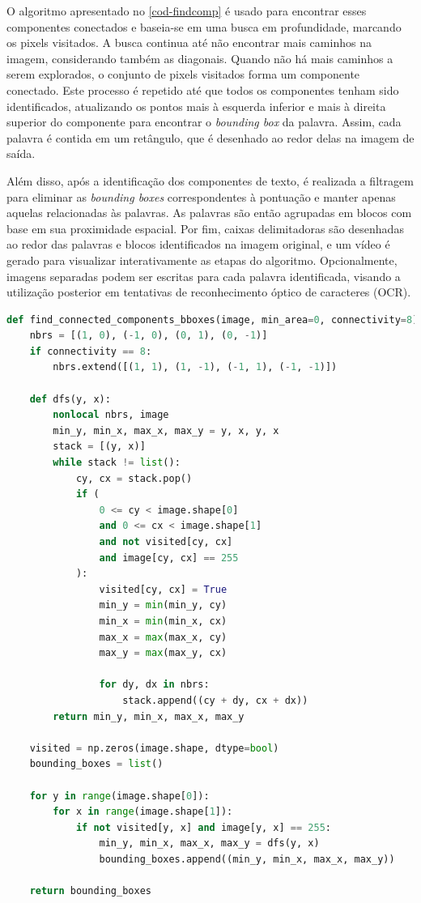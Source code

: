 \documentclass[english, 
               brazil, 
               bsc] %
               {dcomp-abntex2}
\begin{document}
O algoritmo apresentado no \autoref{cod-findcomp} é usado para encontrar esses componentes conectados e baseia-se em uma busca em profundidade, marcando os pixels visitados. A busca continua até não encontrar mais caminhos na imagem, considerando também as diagonais. Quando não há mais caminhos a serem explorados, o conjunto de pixels visitados forma um componente conectado. Este processo é repetido até que todos os componentes tenham sido identificados, atualizando os pontos mais à esquerda inferior e mais à direita superior do componente para encontrar o \textit{bounding box} da palavra. Assim, cada palavra é contida em um retângulo, que é desenhado ao redor delas na imagem de saída.

Além disso, após a identificação dos componentes de texto, é realizada a filtragem para eliminar as \textit{bounding boxes} correspondentes à pontuação e manter apenas aquelas relacionadas às palavras. As palavras são então agrupadas em blocos com base em sua proximidade espacial. Por fim, caixas delimitadoras são desenhadas ao redor das palavras e blocos identificados na imagem original, e um vídeo é gerado para visualizar interativamente as etapas do algoritmo. Opcionalmente, imagens separadas podem ser escritas para cada palavra identificada, visando a utilização posterior em tentativas de reconhecimento óptico de caracteres (OCR). 

\begin{codigo}[h]
  \caption{\small .}
 \label{cod-findcomp}
\begin{lstlisting}[language=python]
def find_connected_components_bboxes(image, min_area=0, connectivity=8):
    nbrs = [(1, 0), (-1, 0), (0, 1), (0, -1)]
    if connectivity == 8:
        nbrs.extend([(1, 1), (1, -1), (-1, 1), (-1, -1)])

    def dfs(y, x):
        nonlocal nbrs, image
        min_y, min_x, max_x, max_y = y, x, y, x
        stack = [(y, x)]
        while stack != list():
            cy, cx = stack.pop()
            if (
                0 <= cy < image.shape[0]
                and 0 <= cx < image.shape[1]
                and not visited[cy, cx]
                and image[cy, cx] == 255
            ):
                visited[cy, cx] = True
                min_y = min(min_y, cy)
                min_x = min(min_x, cx)
                max_x = max(max_x, cy)
                max_y = max(max_y, cx)

                for dy, dx in nbrs:
                    stack.append((cy + dy, cx + dx))
        return min_y, min_x, max_x, max_y

    visited = np.zeros(image.shape, dtype=bool)
    bounding_boxes = list()

    for y in range(image.shape[0]):
        for x in range(image.shape[1]):
            if not visited[y, x] and image[y, x] == 255:
                min_y, min_x, max_x, max_y = dfs(y, x)
                bounding_boxes.append((min_y, min_x, max_x, max_y))

    return bounding_boxes

\end{lstlisting}
\end{codigo}
\end{document}
